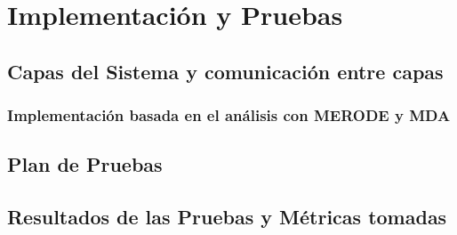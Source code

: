 \chapter{Implementaci\'on y Pruebas}
\begin{indentar}
\end{indentar}

\section{Capas del Sistema y comunicaci\'on entre capas}
\begin{indentar}
\end{indentar}

\subsection{Implementaci\'on basada en el an\'alisis con MERODE y MDA}
\begin{indentar}
\end{indentar}

\section{Plan de Pruebas}
\begin{indentar}
\end{indentar}

\section{Resultados de las Pruebas y M\'etricas tomadas}
\begin{indentar}
\end{indentar}
